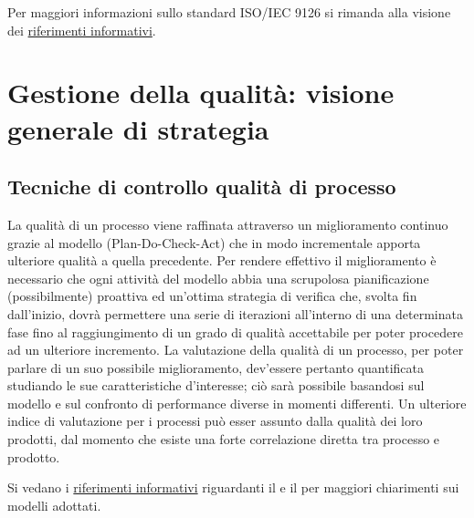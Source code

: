 \documentclass[a4paper, titlepage]{article}
\begin{document}
Per maggiori informazioni sullo standard ISO/IEC 9126 si rimanda alla visione dei \hyperref[rifinfo] {riferimenti informativi}.

\section{Gestione della qualità: visione generale di strategia}

\subsection{Tecniche di controllo qualità di processo}
La qualità di un processo viene raffinata attraverso un miglioramento continuo grazie al modello  (Plan-Do-Check-Act) che in modo incrementale apporta ulteriore qualità a quella precedente. Per rendere effettivo il miglioramento è necessario che ogni attività del modello abbia una scrupolosa pianificazione (possibilmente) proattiva ed un'ottima strategia di verifica che, svolta fin dall'inizio, dovrà permettere una serie di iterazioni all'interno di una determinata fase fino al raggiungimento di un grado di qualità accettabile per poter procedere ad un ulteriore incremento.
\newline La valutazione della qualità di un processo, per poter parlare di un suo possibile miglioramento, dev'essere pertanto quantificata studiando le sue caratteristiche d'interesse; ciò sarà possibile basandosi sul modello  e sul confronto di performance diverse in momenti differenti.
\newline Un ulteriore indice di valutazione per i processi può esser assunto dalla qualità dei loro prodotti, dal momento che esiste una forte correlazione diretta tra processo e prodotto.

Si vedano i \hyperref[rifinfo]{riferimenti informativi} riguardanti il  e il  per maggiori chiarimenti sui modelli adottati.
\end{document}
